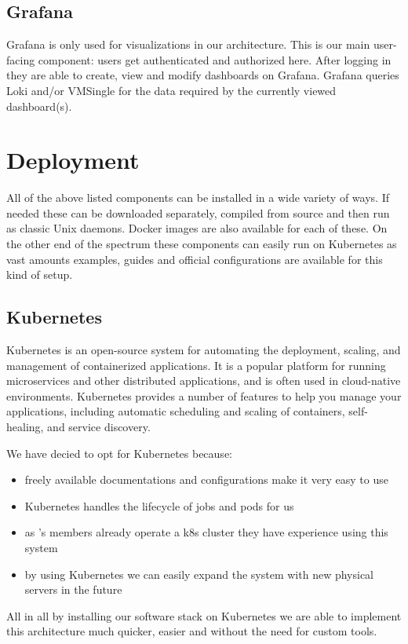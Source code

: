 \subsection{Grafana}

Grafana is only used for visualizations in our architecture. This is our main
user-facing component: users get authenticated and authorized here. After
logging in they are able to create, view and modify dashboards on Grafana.
Grafana queries Loki and/or VMSingle for the data required by the currently
viewed dashboard(s).

\section{Deployment}

All of the above listed components can be installed in a wide variety of ways.
If needed these can be downloaded separately, compiled from source and then run
as classic Unix daemons. Docker images are also available for each of these. On
the other end of the spectrum these components can easily run on Kubernetes as
vast amounts examples, guides and official configurations are available for
this kind of setup.

\subsection{Kubernetes}

Kubernetes\cite{k} is an open-source system for automating the deployment, scaling, and
management of containerized applications. It is a popular platform for running
microservices and other distributed applications, and is often used in
cloud-native environments. Kubernetes provides a number of features to help you
manage your applications, including automatic scheduling and scaling of
containers, self-healing, and service discovery.

We have decied to opt for Kubernetes because:
\begin{itemize}
	\item freely available documentations and configurations make it very easy to use
	\item Kubernetes handles the lifecycle of jobs and pods for us
	\item as \kszk's members already operate a k8s cluster they have experience using this system
	\item by using Kubernetes we can easily expand the system with new physical servers in the future
\end{itemize}

All in all by installing our software stack on Kubernetes we are able to
implement this architecture much quicker, easier and without the need for
custom tools.
